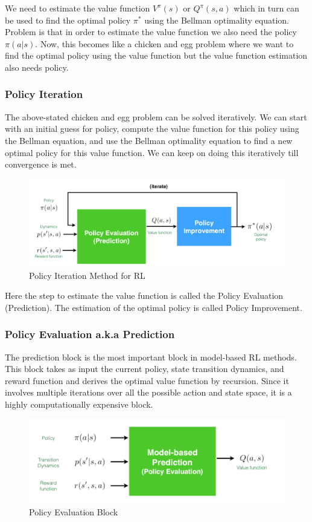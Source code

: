 \documentclass[11pt]{article}
\begin{document}
We need to estimate the value function $V^{\pi} (s)$ or $Q^{\pi}(s, a)$ which in turn can be used to find the optimal policy $\pi^{*}$ using the Bellman optimality equation. Problem is that in order to estimate the value function we also need the policy $\pi(a|s)$. Now, this becomes like a chicken and egg problem where we want to find the optimal policy using the value function but the value function estimation also needs policy.
\subsubsection{Policy Iteration}
The above-stated chicken and egg problem can be solved iteratively. We can start with an initial guess for policy, compute the value function for this policy using the Bellman equation, and use the Bellman optimality equation to find a new optimal policy for this value function. We can keep on doing this iteratively till convergence is met. \\
\begin{figure}[H]
    \centering
    \includegraphics[scale=0.4]{images/value_based.png}
    \caption{Policy Iteration Method for RL}
\end{figure}
Here the step to estimate the value function is called the Policy Evaluation (Prediction). The estimation of the optimal policy is called Policy Improvement. \\

\subsubsection{Policy Evaluation a.k.a Prediction}
The prediction block is the most important block in model-based RL methods. This block takes as input the current policy, state transition dynamics, and reward function and derives the optimal value function by recursion. Since it involves multiple iterations over all the possible action and state space, it is a highly computationally expensive block. 
\begin{figure}[H]
    \centering
    \includegraphics[scale=0.4]{images/prediction.png}
    \caption{Policy Evaluation Block}
\end{figure}
\end{document}
